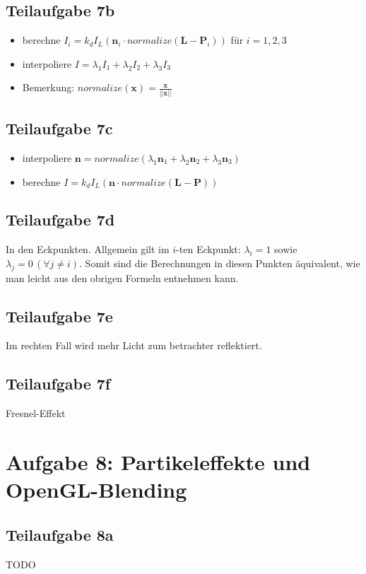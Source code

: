 \documentclass[a4paper]{scrartcl}
\begin{document}
\subsection*{Teilaufgabe 7b}
\begin{itemize}
    \item berechne $I_i = k_d I_L (\mathbf{n}_i \cdot normalize(\mathbf{L}-\mathbf{P}_i))$ für $i = 1,2,3$
    \item interpoliere $I = \lambda_1 I_1 + \lambda_2 I_2 + \lambda_3 I_3$
    \item Bemerkung: $normalize(\mathbf{x}) = \frac{\mathbf{x}}{||\mathbf{x}||}$
\end{itemize}

\subsection*{Teilaufgabe 7c}
\begin{itemize}
    \item interpoliere $\mathbf{n} = normalize(\lambda_1 \mathbf{n}_1 + \lambda_2 \mathbf{n}_2 + \lambda_3 \mathbf{n}_3)$
    \item berechne $I = k_d I_L (\mathbf{n} \cdot normalize(\mathbf{L}-\mathbf{P}))$
\end{itemize}

\subsection*{Teilaufgabe 7d}
In den Eckpunkten. Allgemein gilt im $i$-ten Eckpunkt: $\lambda_i = 1$ sowie $\lambda_j = 0 \, (\forall j \neq i)$.
Somit sind die Berechnungen in diesen Punkten äquivalent, wie man leicht aus den obrigen Formeln entnehmen kann.

\subsection*{Teilaufgabe 7e}
Im rechten Fall wird mehr Licht zum betrachter reflektiert.

\subsection*{Teilaufgabe 7f}
Fresnel-Effekt

\section*{Aufgabe 8: Partikeleffekte und OpenGL-Blending}
\subsection*{Teilaufgabe 8a}
TODO
\end{document}
